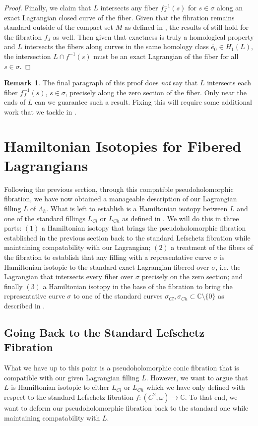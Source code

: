 \documentclass[10pt]{amsart}
\theoremstyle{plain}
\theoremstyle{definition}
\newtheorem{remark}[thm]{Remark}
\numberwithin{equation}{section}
\newcommand{\C}{\mathbb{C}}
\newcommand{\La}{\Lambda}
\newcommand{\sse}{\subset}
\newcommand{\sm}{\setminus}
\newcommand{\wt}{\widetilde}
\begin{document}
\begin{proof}
Finally, we claim that $L$ intersects any fiber $f_J^{-1}(s)$ for $s\in \sigma$ along an exact Lagrangian closed curve of the fiber. Given that the fibration remains standard outside of the compact set $M$ as defined in , the results of  still hold for the fibration $f_J$ as well. Then given that exactness is truly a homological property and $L$ intersects the fibers along curves in the same homology class $\wt{e_0}\in H_1(L)$, the intersection $L\cap f^{-1}(s)$ must be an exact Lagrangian of the fiber for all $s\in \sigma$.
\end{proof}

\begin{remark}\label{rmk:notonlyzerosection} The final paragraph of this proof does \textit{not} say that $L$ intersects each fiber $f_J^{-1}(s)$, $s\in \sigma$, precisely along the zero section of the fiber. Only near the ends of $L$ can we guarantee such a result. Fixing this will require some additional work that we tackle in .
\end{remark}



\section{Hamiltonian Isotopies for Fibered Lagrangians}\label{sec:hamiso}
Following the previous section, through this compatible pseudoholomorphic fibration, we have now obtained a manageable description of our Lagrangian filling $L$ of $\La_h$. What is left to establish is a Hamiltonian isotopy between $L$ and one of the standard fillings $L_{Cl}$ or $L_{Ch}$ as defined in . We will do this in three parts: $(1)$ a Hamiltonian isotopy that brings the pseudoholomorphic fibration established in the previous section back to the standard Lefschetz fibration while maintaining compatability with our Lagrangian; $(2)$ a treatment of the fibers of the fibration to establish that any filling with a representative curve $\sigma$ is Hamiltonian isotopic to the standard exact Lagrangian fibered over $\sigma$, i.e. the Lagrangian that intersects every fiber over $\sigma$ precisely on the zero section; and finally $(3)$ a Hamiltonian isotopy in the base of the fibration to bring the representative curve $\sigma$ to one of the standard curves $\sigma_{Cl}, \sigma_{Ch} \sse \C\sm \{0\}$ as described in .

\subsection{Going Back to the Standard Lefschetz Fibration}\label{sec:backtolefsch}
What we have up to this point is a pseudoholomorphic conic fibration that is compatible with our given Lagrangian filling $L$. However, we want to argue that $L$ is Hamiltonian isotopic to either $L_{Cl}$ or $L_{Ch}$ which we have only defined with respect to the standard Lefschetz fibration $f:(C^2,\omega)\to \C$. To that end, we want to deform our pseudoholomorphic fibration back to the standard one while maintaining compatability with $L$. 
\end{document}
